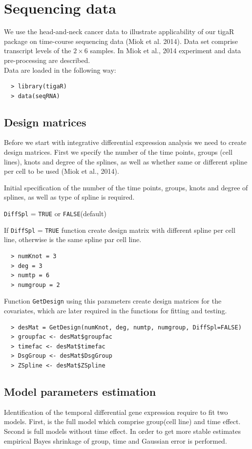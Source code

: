 \documentclass[a4paper]{article}
\begin{document}
\section{Sequencing data}
We use the head-and-neck cancer data to illustrate applicability of our tigaR package on time-course sequencing data (Miok et al. 2014). Data set comprise transcript levels of the $2\times 6$ samples. In Miok et al., 2014 experiment and data pre-processing are described.
\\[0.2in]
Data are loaded in the following way:
\begin{verbatim}
  > library(tigaR)
  > data(seqRNA)
\end{verbatim}

\subsection{Design matrices}
Before we start with integrative differential expression analysis we need to create design matrices. First we specify the number of the time points, groups (cell lines), knots and degree of the splines, as well as whether same or different spline per cell to be used (Miok et al., 2014).

Initial specification of the number of the time points, groups, knots and degree of splines, as well as type of spline is required.
\begin{compactitem}
\item {\tt DiffSpl} = {\tt TRUE} or {\tt FALSE}(default) \\
\end{compactitem}
If {\tt DiffSpl} = {\tt TRUE} function create design matrix with different spline per cell line, otherwise is the same spline par cell line.

\begin{verbatim}
  > numKnot = 3    
  > deg = 3         
  > numtp = 6      
  > numgroup = 2  
\end{verbatim}

  Function {\tt GetDesign} using this parameters create design matrices for the covariates, which are later required in the functions for fitting and testing.
\begin{verbatim}
  > desMat = GetDesign(numKnot, deg, numtp, numgroup, DiffSpl=FALSE)
  > groupfac <- desMat$groupfac
  > timefac <- desMat$timefac
  > DsgGroup <- desMat$DsgGroup
  > ZSpline <- desMat$ZSpline
\end{verbatim}

\subsection{Model parameters estimation}
Identification of the temporal differential gene expression require to fit two models. First, is the full model which comprise group(cell line) and time effect. Second is full models without time effect. In order to get more stable estimates empirical Bayes shrinkage of group, time and Gaussian error is performed. 
\end{document}
